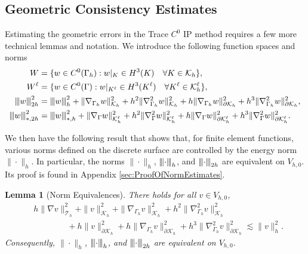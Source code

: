 \documentclass[10pt, a4paper]{amsart}
\newcommand{\p}{\partial}
\newcommand{\nab}{\nabla}
\newcommand{\bmu}{{\bm \mu}}
\newcommand{\calT}{\mathcal{T}}
\newcommand{\calE}{\mathcal{E}}
\newcommand{\calK}{\mathcal{K}}
\newtheorem{lemma}[theorem]{Lemma}
\theoremstyle{definition}
\theoremstyle{remark}
\theoremstyle{example}
\numberwithin{equation}{section}
\newcommand{\tbar}[1]{{\left\vert\kern-0.25ex\left\vert\kern-0.25ex\left\vert #1 
    \right\vert\kern-0.25ex\right\vert\kern-0.25ex\right\vert}}
\begin{document}
\subsection{Geometric Consistency Estimates}



Estimating the geometric errors 
in the Trace $C^0$ IP method requires
a few more technical lemmas and notation.
We introduce the following function spaces and norms
\begin{align*}
W
& = \{w \in C^0(\Gamma_h): w|_{K} \in H^3(K) \quad \forall K \in \calK_h\}, \\
W^\ell
& = \{w \in C^0(\Gamma): w|_{K^\ell} \in H^3(K^\ell) \quad \forall K^\ell \in \calK_h^\ell\}, \\
\tbar{w}_{2h}^2
& = \tbar{w}_h^2 +
\|\nab_{\Gamma_h}w\|_{\calK_h}^2 + h^2\|\nab_{\Gamma_h}^2w\|_{\calK_h}^2
+ h\|\nab_{\Gamma_h}w\|_{\partial\calK_h}^2 + h^3\|\nab_{\Gamma_h}^2w\|_{\partial\calK_h}^2,\\ %
\tbar{w}_{*, 2h}^2
& = \tbar{w}_{*,h}^2 
+ \|\nab_{\Gamma}w\|_{\calK^\ell_h}^2 + h^2\|\nab_{\Gamma}^2w\|_{\calK^\ell_h}^2
  + h\|\nab_{\Gamma}w\|_{\partial\calK_h^\ell}^2 + h^3\|\nab_{\Gamma}^2 w\|_{\p \calK_h^\ell}^2.
\end{align*}


We then have the following result
that shows that, for finite element functions, various norms 
defined on the discrete surface are controlled 
by the energy norm $\|{\cdot}\|_h$.
In particular, the norms $\|\cdot\|_h$, $\tbar{\cdot}_h$, and $\tbar{\cdot}_{2h}$
are equivalent on $V_{h,0}$.
Its proof is found in Appendix \ref{sec:ProofOfNormEstimates}.

\begin{lemma}[Norm Equivalences]\label{lem:NormEstimates}
There holds for all $v\in V_{h,0}$,
\begin{equation} \label{eqn:AllAtOnce}
\begin{split}
&h\|\nab v\|_{\calT_h}^2+ \|v\|_{\calK_h}^2 
 + \|\nab_{\Gamma_h} v\|_{\calK_h}^2
+h^2\|\nab_{\Gamma_h}^2v\|_{\calK_h}^2\\ 
&\qquad\qquad
+h \|v\|_{\p \calK_h}^2 
+ h \|\nab_{\Gamma_h} v\|_{\p \calK_h}^2
+h^3\|\nab_{\Gamma_h}^2v\|_{\p\calK_h}^2\lesssim \|v\|_h^2.
\end{split}
\end{equation}
Consequently, $\|\cdot\|_h$, $\tbar{\cdot}_h$, and $\tbar{\cdot}_{2h}$ are equivalent
on $V_{h,0}$.
\end{lemma}
\end{document}
